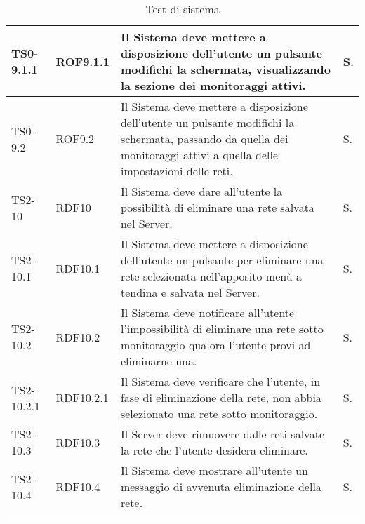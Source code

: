 \begin{longtable}{|C{.15\textwidth}|C{.14\textwidth}|m{.51\textwidth}|C{.08\textwidth}|}
\hline
TS0-9.1.1 & ROF9.1.1 & Il Sistema deve mettere a disposizione dell'utente un pulsante modifichi la schermata, visualizzando la sezione dei monitoraggi attivi. & S. \\
\hline
{}TS0-9.2 & ROF9.2 & Il Sistema deve mettere a disposizione dell'utente un pulsante modifichi la schermata, passando da quella dei monitoraggi attivi a quella delle impostazioni delle reti. & S. \\
\hline
TS2-10 & RDF10 & Il Sistema deve dare all'utente la possibilità di eliminare una rete salvata nel Server. & S. \\
\hline
{}TS2-10.1 & RDF10.1 & Il Sistema deve mettere a disposizione dell'utente un pulsante per eliminare una rete selezionata nell'apposito menù a tendina e salvata nel Server. & S. \\
\hline
TS2-10.2 & RDF10.2 & Il Sistema deve notificare all'utente l'impossibilità di eliminare una rete sotto monitoraggio qualora l'utente provi ad eliminarne una. & S. \\
\hline
{}TS2-10.2.1 & RDF10.2.1 & Il Sistema deve verificare che l'utente, in fase di eliminazione della rete, non abbia selezionato una rete sotto monitoraggio. & S. \\
\hline
TS2-10.3 & RDF10.3 & Il Server deve rimuovere dalle reti salvate la rete che l'utente desidera eliminare. & S. \\
\hline

TS2-10.4 & RDF10.4 & Il Sistema deve mostrare all'utente un messaggio di avvenuta eliminazione della rete. & S. \\
\hline

\caption{Test di sistema}
\label{testdisistema}
\end{longtable}